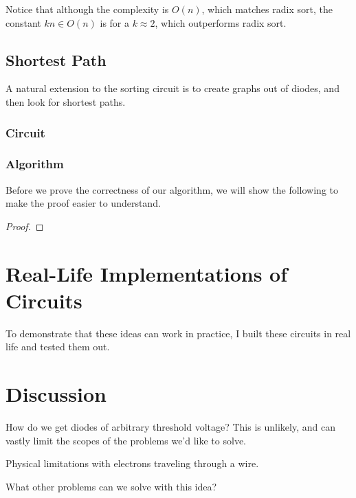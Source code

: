 \documentclass{article}
\begin{document}
Notice that although the complexity is $O(n)$, which matches radix sort,
the constant $kn \in O(n)$ is for a $k \approx 2$, which outperforms radix sort.

\subsection{Shortest Path}
A natural extension to the sorting circuit is to create graphs out of diodes,
and then look for shortest paths.

\subsubsection{Circuit}

\subsubsection{Algorithm}

Before we prove the correctness of our algorithm,
we will show the following to make the proof easier to understand.

\begin{lemma}
\end{lemma}

\begin{proof}

\end{proof}

\section{Real-Life Implementations of Circuits}

To demonstrate that these ideas can work in practice, I built these circuits
in real life and tested them out.

\section{Discussion}

How do we get diodes of arbitrary threshold voltage?
This is unlikely, and can vastly limit the scopes of the problems we'd like to solve.

Physical limitations with electrons traveling through a wire.

What other problems can we solve with this idea?




\end{document}
